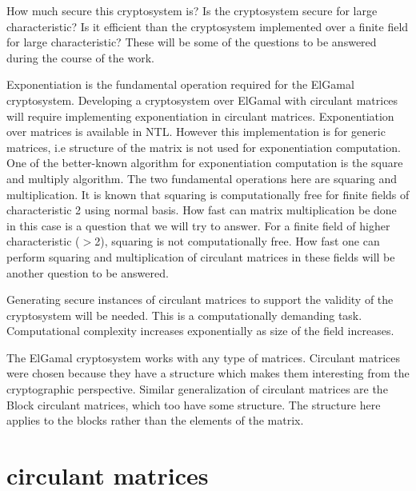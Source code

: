 How much secure this cryptosystem is? Is the cryptosystem secure for large characteristic?
Is it efficient than the cryptosystem implemented over a finite field for large characteristic?
These will be some of the questions to be answered during the course of the work.

Exponentiation is the fundamental operation required for the ElGamal cryptosystem.
Developing a cryptosystem over ElGamal with circulant matrices will require implementing exponentiation in circulant matrices.
Exponentiation over matrices is available in NTL.
However this implementation is for generic matrices, i.e structure of the matrix is not used for exponentiation computation.
One of the better-known algorithm for exponentiation computation is the square and multiply algorithm.
The two fundamental operations here are squaring and multiplication.
It is known that squaring is computationally free for finite fields of characteristic 2 using normal basis.
How fast can matrix multiplication be done in this case is a question that we will try to answer.
For a finite field of higher characteristic ($>$2), squaring is not computationally free.
How fast one can perform squaring and multiplication of circulant matrices in these fields will be another question to be answered.

Generating secure instances of circulant matrices to support the validity of the cryptosystem will be needed.
This is a computationally demanding task.
Computational complexity increases exponentially as size of the field increases.

The ElGamal cryptosystem works with any type of matrices. 
Circulant matrices were chosen because they have a structure which makes them interesting from the cryptographic perspective.
Similar generalization of circulant matrices are the Block circulant matrices, which too have some structure.
The structure here applies to the blocks rather than the elements of the matrix.

\section{circulant matrices}

